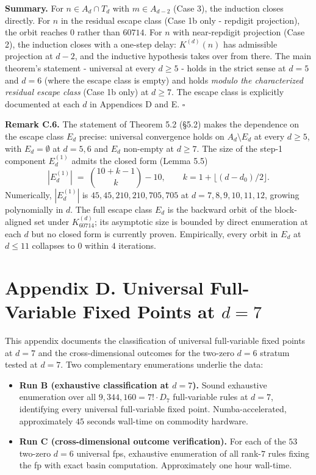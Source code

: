 \documentclass[11pt,letterpaper]{article}
\providecommand{\tightlist}{%
  \setlength{\itemsep}{0pt}\setlength{\parskip}{0pt}}
\theoremstyle{paperstyle}
\theoremstyle{paperstyledef}
\theoremstyle{paperstylerem}
\begin{document}
\textbf{Summary.} For \(n \in A_d \cap T_d\) with \(m \in A_{d-2}\)
(Case 3), the induction closes directly. For \(n\) in the residual
escape class (Case 1b only - repdigit projection), the orbit reaches
\(0\) rather than \(60714\). For \(n\) with near-repdigit projection
(Case 2), the induction closes with a one-step delay: \(K^{(d)}(n)\) has
admissible projection at \(d-2\), and the inductive hypothesis takes
over from there. The main theorem's statement - universal at every
\(d \geq 5\) - holds in the strict sense at \(d = 5\) and \(d = 6\)
(where the escape class is empty) and holds \emph{modulo the
characterized residual escape class} (Case 1b only) at \(d \geq 7\). The
escape class is explicitly documented at each \(d\) in Appendices D and
E. \(\square\)

\textbf{Remark C.6.} The statement of Theorem 5.2 (§5.2) makes the
dependence on the escape class \(E_d\) precise: universal convergence
holds on \(A_d \setminus E_d\) at every \(d \geq 5\), with
\(E_d = \emptyset\) at \(d = 5, 6\) and \(E_d\) non-empty at
\(d \geq 7\). The size of the step-1 component \(E_d^{(1)}\) admits the
closed form (Lemma 5.5)
\[|E_d^{(1)}| \;=\; \binom{10 + k - 1}{k} - 10, \qquad k = 1 + \lfloor (d - d_0)/2 \rfloor.\]
Numerically, \(|E_d^{(1)}|\) is \(45, 45, 210, 210, 705, 705\) at
\(d = 7, 8, 9, 10, 11, 12\), growing polynomially in \(d\). The full
escape class \(E_d\) is the backward orbit of the block-aligned set
under \(K_{60714}^{(d)}\); its asymptotic size is bounded by direct
enumeration at each \(d\) but no closed form is currently proven.
Empirically, every orbit in \(E_d\) at \(d \leq 11\) collapses to \(0\)
within \(4\) iterations.

\hypertarget{appendix-d.-universal-full-variable-fixed-points-at-d-7}{%
\section{\texorpdfstring{Appendix D. Universal Full-Variable Fixed
Points at
\(d = 7\)}{Appendix D. Universal Full-Variable Fixed Points at d = 7}}\label{appendix-d.-universal-full-variable-fixed-points-at-d-7}}

This appendix documents the classification of universal full-variable
fixed points at \(d = 7\) and the cross-dimensional outcomes for the
two-zero \(d = 6\) stratum tested at \(d = 7\). Two complementary
enumerations underlie the data:

\begin{itemize}
\tightlist
\item
  \textbf{Run B (exhaustive classification at \(d = 7\)).} Sound
  exhaustive enumeration over all \(9{,}344{,}160 = 7! \cdot D_7\)
  full-variable rules at \(d = 7\), identifying every universal
  full-variable fixed point. Numba-accelerated, approximately \(45\)
  seconds wall-time on commodity hardware.
\item
  \textbf{Run C (cross-dimensional outcome verification).} For each of
  the \(53\) two-zero \(d = 6\) universal fps, exhaustive enumeration of
  all rank-\(7\) rules fixing the fp with exact basin computation.
  Approximately one hour wall-time.
\end{itemize}
\end{document}
